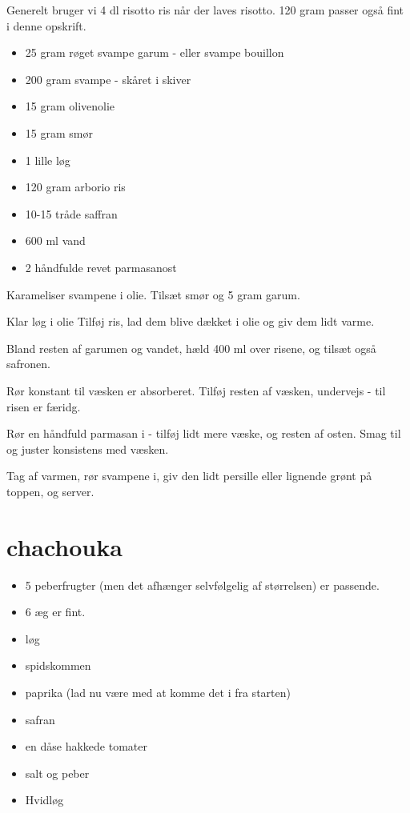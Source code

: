 \documentclass[
  letterpaper,
  DIV=11,
  numbers=noendperiod]{scrreprt}
\providecommand{\tightlist}{%
  \setlength{\itemsep}{0pt}\setlength{\parskip}{0pt}}\usepackage{longtable,booktabs,array}
\begin{document}
Generelt bruger vi 4 dl risotto ris når der laves risotto. 120 gram
passer også fint i denne opskrift.

\begin{itemize}
\tightlist
\item
  25 gram røget svampe garum - eller svampe bouillon
\item
  200 gram svampe - skåret i skiver
\item
  15 gram olivenolie
\item
  15 gram smør
\item
  1 lille løg
\item
  120 gram arborio ris
\item
  10-15 tråde saffran
\item
  600 ml vand
\item
  2 håndfulde revet parmasanost
\end{itemize}

Karameliser svampene i olie. Tilsæt smør og 5 gram garum.

Klar løg i olie Tilføj ris, lad dem blive dækket i olie og giv dem lidt
varme.

Bland resten af garumen og vandet, hæld 400 ml over risene, og tilsæt
også safronen.

Rør konstant til væsken er absorberet. Tilføj resten af væsken,
undervejs - til risen er færidg.

Rør en håndfuld parmasan i - tilføj lidt mere væske, og resten af osten.
Smag til og juster konsistens med væsken.

Tag af varmen, rør svampene i, giv den lidt persille eller lignende
grønt på toppen, og server.

\hypertarget{chachouka}{%
\section{chachouka}\label{chachouka}}

\begin{itemize}
\tightlist
\item
  5 peberfrugter (men det afhænger selvfølgelig af størrelsen) er
  passende.
\item
  6 æg er fint.
\item
  løg
\item
  spidskommen
\item
  paprika (lad nu være med at komme det i fra starten)
\item
  safran
\item
  en dåse hakkede tomater
\item
  salt og peber
\item
  Hvidløg
\end{itemize}
\end{document}
